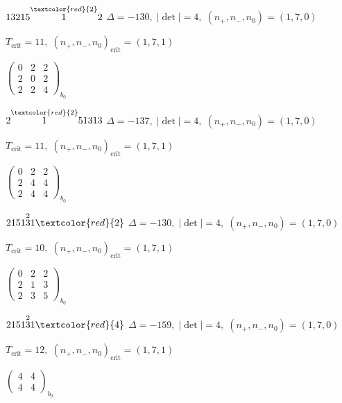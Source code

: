 \documentclass[10pt]{article}
\begin{document}
\smallskip

$13215\overset{\textcolor{red}{2}}{1}2$ \quad $\Delta=-130,\; |\det|=4,\; (n_+,n_-,n_0)=(1,7,0)$

\hspace{1em}$T_{\text{crit}}=11,\; (n_+,n_-,n_0)_{\text{crit}}=(1,7,1)$

\hspace{2em}$\left(\begin{smallmatrix}0 & 2 & 2 \\ 2 & 0 & 2 \\ 2 & 2 & 4\end{smallmatrix}\right)_{\!b_0}$

\smallskip

$2\overset{\textcolor{red}{2}}{1}51313$ \quad $\Delta=-137,\; |\det|=4,\; (n_+,n_-,n_0)=(1,7,0)$

\hspace{1em}$T_{\text{crit}}=11,\; (n_+,n_-,n_0)_{\text{crit}}=(1,7,1)$

\hspace{2em}$\left(\begin{smallmatrix}0 & 2 & 2 \\ 2 & 4 & 4 \\ 2 & 4 & 4\end{smallmatrix}\right)_{\!b_0}$

\smallskip

$2151\overset{2}{3}1\textcolor{red}{2}$ \quad $\Delta=-130,\; |\det|=4,\; (n_+,n_-,n_0)=(1,7,0)$

\hspace{1em}$T_{\text{crit}}=10,\; (n_+,n_-,n_0)_{\text{crit}}=(1,7,1)$

\hspace{2em}$\left(\begin{smallmatrix}0 & 2 & 2 \\ 2 & 1 & 3 \\ 2 & 3 & 5\end{smallmatrix}\right)_{\!b_0}$

$2151\overset{2}{3}1\textcolor{red}{4}$ \quad $\Delta=-159,\; |\det|=4,\; (n_+,n_-,n_0)=(1,7,0)$

\hspace{1em}$T_{\text{crit}}=12,\; (n_+,n_-,n_0)_{\text{crit}}=(1,7,1)$

\hspace{2em}$\left(\begin{smallmatrix}4 & 4 \\ 4 & 4\end{smallmatrix}\right)_{\!b_0}$
\end{document}
